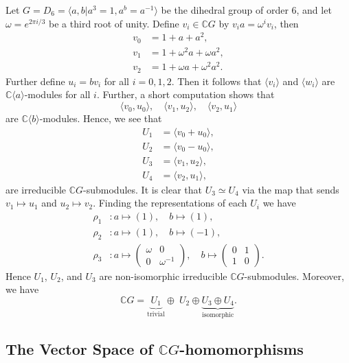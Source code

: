 \documentclass[11pt, notitlepage]{article}
\numberwithin{equation}{section}
\theoremstyle{plain}
\theoremstyle{definition}
\newenvironment{example}
	{\pushQED{\qed}\renewcommand{\qedsymbol}{$\blacktriangleleft$}\examplex}
	{\popQED\endexamplex}
\newcommand{\C}{\mathbb{C}}
\newcommand{\CG}{{\mathbb{C}G}}
\begin{document}
\begin{example}
Let $G = D_6 = \langle a,b|a^3=1,a^b=a^{-1}\rangle$ be the dihedral group of order 6, and let $\omega = e^{2\pi i/3}$ be a third root of unity. Define $v_i \in \C G$ by $v_ia = \omega^i v_i$, then
\begin{align*}
    v_0 &= 1 + a + a^2,\\
    v_1 &= 1 + \omega^2 a + \omega a^2,\\
    v_2 &= 1 + \omega a + \omega^2 a^2.
\end{align*}
Further define $u_i = bv_i$ for all $i=0,1,2$. Then it follows that $\langle v_i \rangle$ and $\langle w_i \rangle$ are $\C \langle a \rangle$-modules for all $i$. Further, a short computation shows that
\[
    \langle v_0,u_0 \rangle, \quad \langle v_1, u_2 \rangle, \quad \langle v_2, u_1 \rangle
\]
are $\C\langle b \rangle$-modules. Hence, we see that
\begin{align*}
    U_1 &= \langle v_0 + u_0 \rangle,\\
    U_2 &= \langle v_0 - u_0 \rangle,\\
    U_3 &= \langle v_1, u_2 \rangle,\\
    U_4 &= \langle v_2, u_1 \rangle,
\end{align*}
are irreducible $\C G$-submodules. It is clear that $U_3 \simeq U_4$ via the map that sends $v_1 \mapsto u_1$ and $u_2 \mapsto v_2$. Finding the representations of each $U_i$ we have
\begin{align*}
    \rho_1 &: a \mapsto (1), \quad b \mapsto (1),\\
    \rho_2 &: a \mapsto (1), \quad b \mapsto (-1),\\
    \rho_3 &: a \mapsto \begin{pmatrix*}
        \omega & 0\\0 & \omega^{-1}
    \end{pmatrix*},\quad b \mapsto \begin{pmatrix*}
        0 & 1\\1 & 0
    \end{pmatrix*}.
\end{align*}
Hence $U_1$, $U_2$, and $U_3$ are non-isomorphic irreducible $\C G$-submodules. Moreover, we have
\[
    \C G = \underbrace{U_1}_{\text{trivial}} \oplus \;U_2 \oplus \underbrace{U_3 \oplus U_4}_{\text{isomorphic}}.
\]
\end{example}




\subsection{The Vector Space of $\CG$-homomorphisms}
\end{document}
